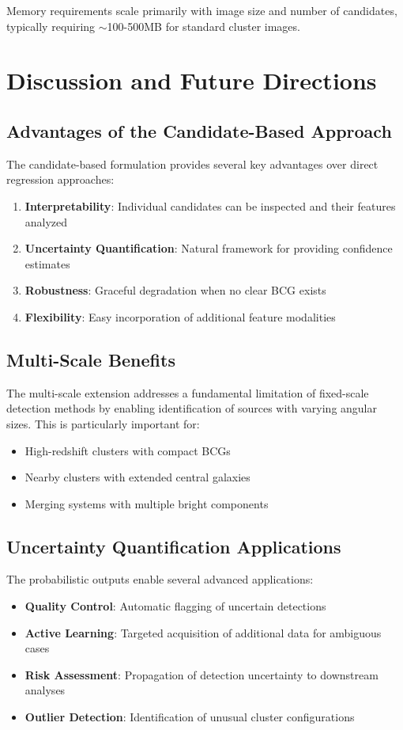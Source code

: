 \documentclass[twocolumn,10pt]{aastex631}
\begin{document}
Memory requirements scale primarily with image size and number of candidates, typically requiring $\sim$100-500MB for standard cluster images.

\section{Discussion and Future Directions}

\subsection{Advantages of the Candidate-Based Approach}
The candidate-based formulation provides several key advantages over direct regression approaches:

\begin{enumerate}
\item \textbf{Interpretability}: Individual candidates can be inspected and their features analyzed
\item \textbf{Uncertainty Quantification}: Natural framework for providing confidence estimates
\item \textbf{Robustness}: Graceful degradation when no clear BCG exists
\item \textbf{Flexibility}: Easy incorporation of additional feature modalities
\end{enumerate}

\subsection{Multi-Scale Benefits}
The multi-scale extension addresses a fundamental limitation of fixed-scale detection methods by enabling identification of sources with varying angular sizes. This is particularly important for:
\begin{itemize}
\item High-redshift clusters with compact BCGs
\item Nearby clusters with extended central galaxies  
\item Merging systems with multiple bright components
\end{itemize}

\subsection{Uncertainty Quantification Applications}
The probabilistic outputs enable several advanced applications:
\begin{itemize}
\item \textbf{Quality Control}: Automatic flagging of uncertain detections
\item \textbf{Active Learning}: Targeted acquisition of additional data for ambiguous cases
\item \textbf{Risk Assessment}: Propagation of detection uncertainty to downstream analyses
\item \textbf{Outlier Detection}: Identification of unusual cluster configurations
\end{itemize}
\end{document}
